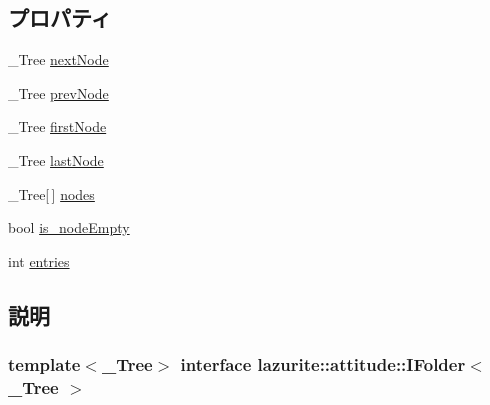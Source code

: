 \subsection*{プロパティ}
\begin{DoxyCompactItemize}
\item 
\_\-Tree \hyperlink{interfacelazurite_1_1attitude_1_1_i_folder_3_01___tree_01_4_a7ed0b97359886d299e9fa8c38bfa8864}{nextNode}
\item 
\_\-Tree \hyperlink{interfacelazurite_1_1attitude_1_1_i_folder_3_01___tree_01_4_a92c4da14156059798236dd8eeaec73e8}{prevNode}
\item 
\_\-Tree \hyperlink{interfacelazurite_1_1attitude_1_1_i_folder_3_01___tree_01_4_ab200f6b8a983e438c063561f19f782f2}{firstNode}
\item 
\_\-Tree \hyperlink{interfacelazurite_1_1attitude_1_1_i_folder_3_01___tree_01_4_a7507045306d9b2ce984a6c356d7bf7ca}{lastNode}
\item 
\_\-Tree\mbox{[}$\,$\mbox{]} \hyperlink{interfacelazurite_1_1attitude_1_1_i_folder_3_01___tree_01_4_ac854bea220ca4367380fd2936c7833fb}{nodes}
\item 
bool \hyperlink{interfacelazurite_1_1attitude_1_1_i_folder_3_01___tree_01_4_a051fb4aa2f8a960d4a51ea5ff72aafe9}{is\_\-nodeEmpty}
\item 
int \hyperlink{interfacelazurite_1_1attitude_1_1_i_folder_3_01___tree_01_4_ad666abfb54b714621d9eaa1f71f84a82}{entries}
\end{DoxyCompactItemize}


\subsection{説明}
\subsubsection*{template$<$\_\-Tree$>$ interface lazurite::attitude::IFolder$<$ \_\-Tree $>$}


